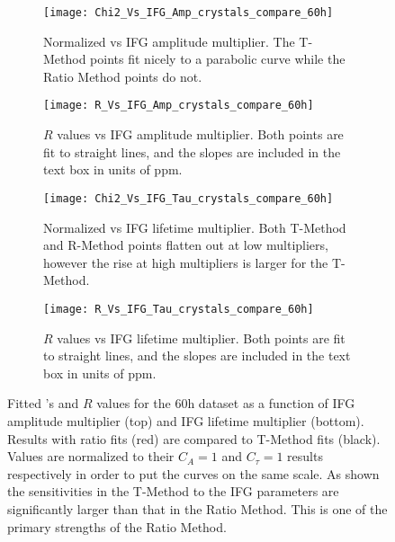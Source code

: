 \begin{figure}
\centering
    \begin{subfigure}[]{0.45\textwidth}
        \centering
        \texttt{[image: Chi2\_Vs\_IFG\_Amp\_crystals\_compare\_60h]}
        \caption{Normalized \chisq vs IFG amplitude multiplier. The T-Method points fit nicely to a parabolic curve while the Ratio Method points do not.}
    \end{subfigure}%
    \hspace{4mm}
    \begin{subfigure}[]{0.45\textwidth}
        \centering
        \texttt{[image: R\_Vs\_IFG\_Amp\_crystals\_compare\_60h]}
        \caption{$R$ values vs IFG amplitude multiplier. Both points are fit to straight lines, and the slopes are included in the text box in units of ppm.}
    \end{subfigure}

    \begin{subfigure}[]{0.45\textwidth}
        \centering
        \texttt{[image: Chi2\_Vs\_IFG\_Tau\_crystals\_compare\_60h]}
        \caption{Normalized \chisq vs IFG lifetime multiplier. Both T-Method and R-Method points flatten out at low multipliers, however the rise at high multipliers is larger for the T-Method.}
    \end{subfigure}%
    \hspace{4mm}
    \begin{subfigure}[]{0.45\textwidth}
        \centering
        \texttt{[image: R\_Vs\_IFG\_Tau\_crystals\_compare\_60h]}
        \caption{$R$ values vs IFG lifetime multiplier. Both points are fit to straight lines, and the slopes are included in the text box in units of ppm.}
    \end{subfigure}
\caption[IFG parameter systematic scan]{Fitted \chisq's and $R$ values for the 60h dataset as a function of IFG amplitude multiplier (top) and IFG lifetime multiplier (bottom). Results with ratio fits (red) are compared to T-Method fits (black). Values are normalized to their $C_{A} = 1$ and $C_{\tau} = 1$ results respectively in order to put the curves on the same scale. As shown the sensitivities in the T-Method to the IFG parameters are significantly larger than that in the Ratio Method. This is one of the primary strengths of the Ratio Method.}
\label{fig:IFG_parameters}
\end{figure}


